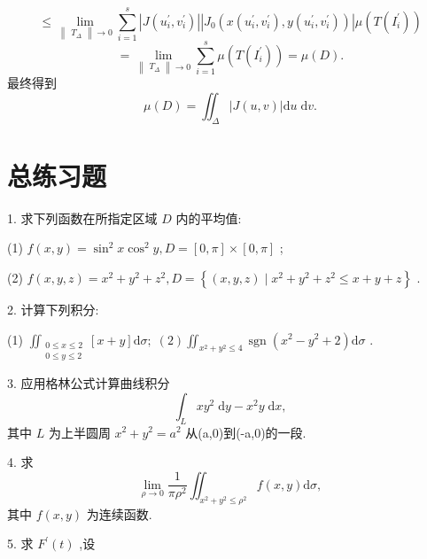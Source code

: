 \[
\leq  \mathop{\lim }\limits_{{\begin{Vmatrix}{T}_{\Delta }\end{Vmatrix} \rightarrow  0}}\mathop{\sum }\limits_{{i = 1}}^{s}\left| {J\left( {{u}_{i}^{\prime },{v}_{i}^{\prime }}\right) }\right| \left| {{J}_{0}\left( {x\left( {{u}_{i}^{\prime },{v}_{i}^{\prime }}\right) ,y\left( {{u}_{i}^{\prime },{v}_{i}^{\prime }}\right) }\right) }\right| \mu \left( {T\left( {I}_{i}^{\prime }\right) }\right)
\]
\[
= \mathop{\lim }\limits_{{\begin{Vmatrix}{T}_{\Delta }\end{Vmatrix} \rightarrow  0}}\mathop{\sum }\limits_{{i = 1}}^{s}\mu \left( {T\left( {I}_{i}^{\prime }\right) }\right)  = \mu \left( D\right) .
\]
最终得到
\[
\mu \left( D\right)  = {\iint }_{\Delta }\left| {J\left( {u,v}\right) }\right| \mathrm{d}u\mathrm{\;d}v.
\]
\section{总练习题}

1. 求下列函数在所指定区域 \(D\) 内的平均值:

(1) \(f\left( {x,y}\right)  = {\sin }^{2}x{\cos }^{2}y,D = \left\lbrack  {0,\pi }\right\rbrack   \times  \left\lbrack  {0,\pi }\right\rbrack\) ;

(2) \(f\left( {x,y,z}\right)  = {x}^{2} + {y}^{2} + {z}^{2},D = \left\{  {\left( {x,y,z}\right)  \mid  {x}^{2} + {y}^{2} + {z}^{2} \leq  x + y + z}\right\}\) .

2. 计算下列积分:

(1) \({\iint }_{\begin{matrix} {0 \leq  x \leq  2} \\  {0 \leq  y \leq  2} \end{matrix}}\left\lbrack  {x + y}\right\rbrack  \mathrm{d}\sigma ;\;\left( 2\right) {\iint }_{{x}^{2} + {y}^{2} \leq  4}\operatorname{sgn}\left( {{x}^{2} - {y}^{2} + 2}\right) \mathrm{d}\sigma\) .

3. 应用格林公式计算曲线积分
\[
{\int }_{L}x{y}^{2}\mathrm{\;d}y - {x}^{2}y\mathrm{\;d}x,
\]
其中 \(L\) 为上半圆周 \({x}^{2} + {y}^{2} = {a}^{2}\) 从(a,0)到(-a,0)的一段.

4. 求
\[
\mathop{\lim }\limits_{{\rho  \rightarrow  0}}\frac{1}{\pi {\rho }^{2}}{\iint }_{{x}^{2} + {y}^{2} \leq  {\rho }^{2}}f\left( {x,y}\right) \mathrm{d}\sigma ,
\]
其中 \(f\left( {x,y}\right)\) 为连续函数.

5. 求 \({F}^{\prime }\left( t\right)\) ,设

